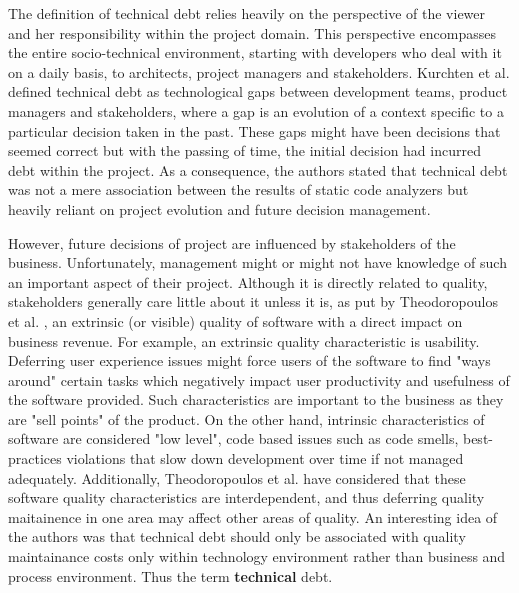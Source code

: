 \documentclass{mprop}
\begin{document}
The definition of technical debt relies heavily on the perspective of the viewer and her responsibility within the project domain.
This perspective encompasses the entire socio-technical environment, starting with developers who deal with it on a daily basis, to architects, project managers and stakeholders.
Kurchten et al. \cite{Kruchten2012} defined technical debt as technological gaps between development teams, product managers and stakeholders, where a gap is an evolution of a context specific to a particular decision taken in the past.
These gaps might have been decisions that seemed correct but with the passing of time, the initial decision had incurred debt within the project.
As a consequence, the authors stated that technical debt was not a mere association between the results of static code analyzers but heavily reliant on project evolution and future decision management.


However, future decisions of project are influenced by stakeholders of the business.
Unfortunately, management might or might not have knowledge of such an important aspect of their project.
Although it is directly related to quality, stakeholders generally care little about it unless it is, as put by Theodoropoulos et al. \cite{Theodoropoulos2011}, an extrinsic (or visible) quality of software with a direct impact on business revenue.
For example, an extrinsic quality characteristic is usability. Deferring user experience issues might force users of the software to find "ways around" certain tasks which negatively impact user productivity and usefulness of the software provided.
Such characteristics are important to the business as they are "sell points" of the product.
On the other hand, intrinsic characteristics of software are considered "low level", code based issues such as code smells, best-practices violations that slow down development over time if not managed adequately.
Additionally, Theodoropoulos et al. \cite{Theodoropoulos2011} have considered that these software quality characteristics are interdependent, and thus deferring quality maitainence in one area may affect other areas of quality.
An interesting idea of the authors was that technical debt should only be associated with quality maintainance costs only within technology environment rather than business and process environment.
Thus the term \textbf{technical} debt.
\end{document}
